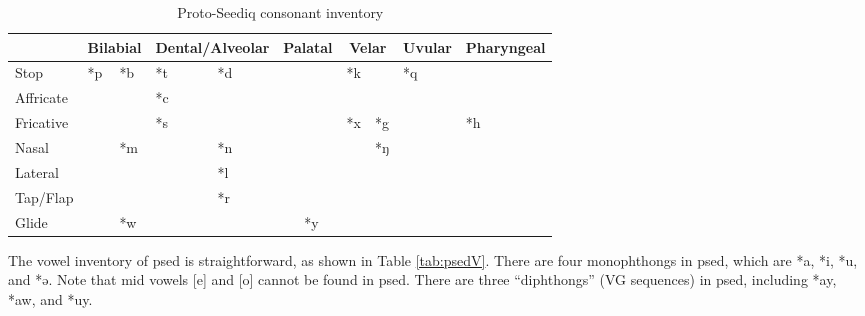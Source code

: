 \begin{table}[!htbp]
\centering
\caption{Proto-Seediq consonant inventory}
\label{tab:psedC}
\begin{tabular}{l|ll|ll|ll|ll|ll|ll}
\hline
                    & \multicolumn{2}{c|}{Bilabial} & \multicolumn{2}{c|}{Dental/Alveolar} & \multicolumn{2}{c|}{Palatal} & \multicolumn{2}{c|}{Velar} & \multicolumn{2}{c|}{Uvular} & \multicolumn{2}{c}{Pharyngeal} \\ \hline
Stop                & *p            & *b           & *t  \quad\quad\quad             & *d               &             &               & *k          &           & *q            &            &                 &              \\
Affricate           &               &              & *c               &                  &             &               &             &             &               &            &                 &              \\
Fricative           &               &              & *s               &                  &             &               & *x          & *g         &               &            & *h              &              \\
Nasal               &               & *m           &                  & *n               &             &               &             & *ŋ          &               &            &                 &              \\
Lateral  &               &              &                  & *l               &             &               &             &             &               &            &                 &              \\
Tap/Flap                 &               &              &                  & *r               &             &               &             &             &               &            &                 &              \\
Glide               &               & *w           &                  &                  &             & *y            &             &             &               &            &                 &              \\ \hline
\end{tabular}
\end{table}

The vowel inventory of \acl{psed} is straightforward, as shown in Table \ref{tab:psedV}. There are four monophthongs in \acl{psed}, which are *a, *i, *u, and *ə. Note that mid vowels [e] and [o] cannot be found in \acl{psed}. There are three ``diphthongs'' (VG sequences) in \acl{psed}, including *ay, *aw, and *uy. 

